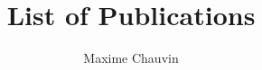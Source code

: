 \documentclass{article}
\title{List of Publications}
\author{Maxime Chauvin}
\begin{document}
  \sloppy
  \maketitle
  \nocite{*}
  \printbibliography
\end{document}
